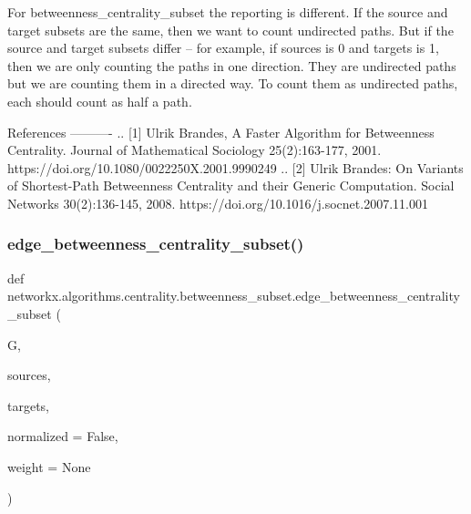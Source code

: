 \begin{DoxyVerb}
For betweenness_centrality_subset the reporting is different.
If the source and target subsets are the same, then we want
to count undirected paths. But if the source and target subsets
differ -- for example, if sources is {0} and targets is {1},
then we are only counting the paths in one direction. They are
undirected paths but we are counting them in a directed way.
To count them as undirected paths, each should count as half a path.

References
----------
.. [1] Ulrik Brandes, A Faster Algorithm for Betweenness Centrality.
   Journal of Mathematical Sociology 25(2):163-177, 2001.
   https://doi.org/10.1080/0022250X.2001.9990249
.. [2] Ulrik Brandes: On Variants of Shortest-Path Betweenness
   Centrality and their Generic Computation.
   Social Networks 30(2):136-145, 2008.
   https://doi.org/10.1016/j.socnet.2007.11.001
\end{DoxyVerb}
 \mbox{\label{namespacenetworkx_1_1algorithms_1_1centrality_1_1betweenness__subset_a57ae25aac4699c40e82a79de34127e2b}} 
\subsubsection{\texorpdfstring{edge\+\_\+betweenness\+\_\+centrality\+\_\+subset()}{edge\_betweenness\_centrality\_subset()}}
{\footnotesize\ttfamily def networkx.\+algorithms.\+centrality.\+betweenness\+\_\+subset.\+edge\+\_\+betweenness\+\_\+centrality\+\_\+subset (\begin{DoxyParamCaption}\item[{}]{G,  }\item[{}]{sources,  }\item[{}]{targets,  }\item[{}]{normalized = {\ttfamily False},  }\item[{}]{weight = {\ttfamily None} }\end{DoxyParamCaption})}

